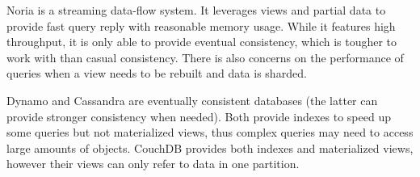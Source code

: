 \documentclass[sigplan,review,anonymous]{acmart}
\begin{document}
Noria \cite{noria} is a streaming data-flow system. 
It leverages views and partial data to provide fast query reply with reasonable memory usage.
While it features high throughput, it is only able to provide eventual consistency, which is tougher to work with than casual consistency.
There is also concerns on the performance of queries when a view needs to be rebuilt and data is sharded.

Dynamo \cite{dynamo} and Cassandra \cite{cassandra} are eventually consistent databases (the latter can provide stronger consistency when needed).
Both provide indexes to speed up some queries but not materialized views, thus complex queries may need to access large amounts of objects.
CouchDB \cite{couchDB} provides both indexes and materialized views, however their views can only refer to data in one partition.




\end{document}
